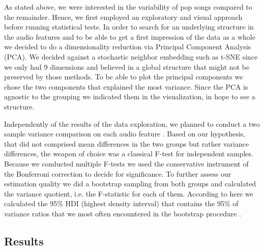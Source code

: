 \documentclass{article}
\begin{document}
As stated above, we were interested in the variability of pop songs compared to the remainder. Hence, we first employed an exploratory and visual approach before running statistical tests. In order to search for an underlying structure in the audio features and to be able to get a first impression of the data as a whole we decided to do a dimensionality reduction via Principal Component Analysis (PCA). We decided against a stochastic neighbor embedding such as t-SNE since we only had 9 dimensions and believed in a global structure that might not be preserved by those methods. To be able to plot the principal components we chose the two components that explained the most variance. Since the PCA is agnostic to the grouping we indicated them in the visualization, in hope to see a structure.

Independently of the results of the data exploration, we planned to conduct a two sample variance comparison on each audio feature \citep{snedecor1989}. Based on our hypothesis, that did not comprised mean differences in the two groups but rather variance differences, the weapon of choice was a classical F-test for independent samples. Because we conducted multiple F-tests we used the conservative instrument of the Bonferroni correction to decide for significance. To further assess our estimation quality we did a bootstrap sampling from both groups and calculated the variance quotient, i.e. the F-statistic for each of them. According to  here \cite{kruschke2014doing}
we calculated the 95\% HDI (highest density interval) that contains the 95\% of variance ratios that we most often encountered in the bootstrap procedure .

\subsection{Results}
\end{document}
